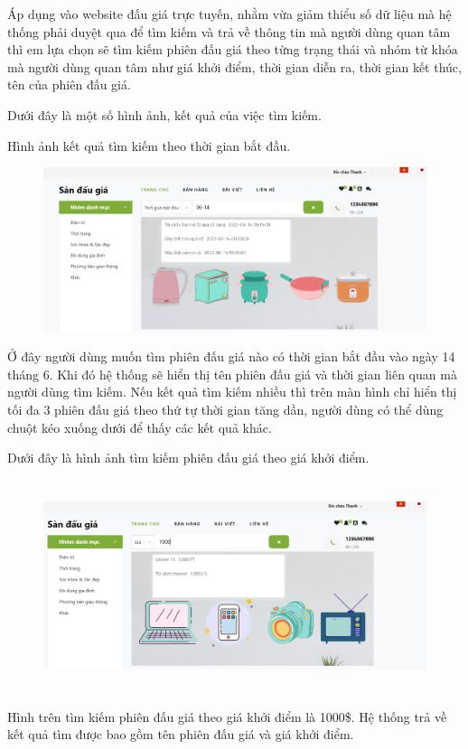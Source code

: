 \documentclass[../DoAn.tex]{subfiles}
\begin{document}
Áp dụng vào website đấu giá trực tuyến, nhằm vừa giảm thiểu số dữ liệu mà hệ thống phải duyệt qua để tìm kiếm và trả về thông tin mà người dùng quan tâm thì em lựa chọn sẽ tìm kiếm phiên đấu giá theo từng trạng thái và nhóm từ khóa mà người dùng quan tâm như giá khởi điểm, thời gian diễn ra, thời gian kết thúc, tên của phiên đấu giá. 

Dưới đây là một số hình ảnh, kết quả của việc tìm kiếm.

Hình ảnh kết quả tìm kiếm theo thời gian bắt đầu.
\begin{figure}[H]
    \centering
    \includegraphics[width=0.75\linewidth,height=4.8cm]{Hinhve/searchstartime.png}
\end{figure}
Ở đây người dùng muốn tìm phiên đấu giá nào có thời gian bắt đầu vào ngày 14 tháng 6. Khi đó hệ thống sẽ hiển thị tên phiên đấu giá và thời gian liên quan mà người dùng tìm kiếm. Nếu kết quả tìm kiếm nhiều thì trên màn hình chỉ hiển thị tối đa 3 phiên đấu giá theo thứ tự thời gian tăng dần, người dùng có thể dùng chuột kéo xuống dưới để thấy các kết quả khác. 

Dưới đây là hình ảnh tìm kiếm phiên đấu giá theo giá khởi điểm.
\begin{figure}[H]
    \centering
    \includegraphics[width=0.75\linewidth,height=6.2cm]{Hinhve/searchprice.png}
\end{figure}
Hình trên tìm kiếm phiên đấu giá theo giá khởi điểm là 1000\$. Hệ thống trả về kết quả tìm được bao gồm tên phiên đấu giá và giá khởi điểm.
\end{document}
